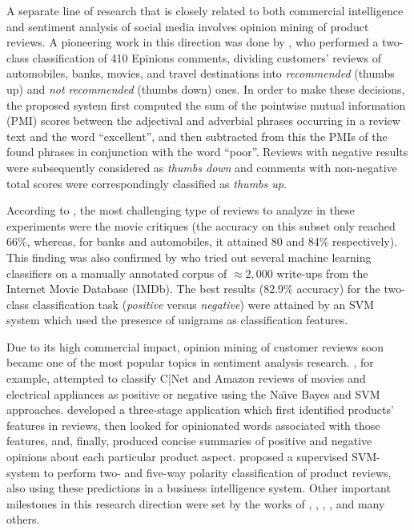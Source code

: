 A separate line of research that is closely related to both commercial
intelligence and sentiment analysis of social media involves opinion
mining of product reviews.  A pioneering work in this direction was
done by \citet{Turney:02}, who performed a two-class classification of
410 Epinions comments, dividing customers' reviews of automobiles,
banks, movies, and travel destinations into \emph{recommended} (thumbs
up) and \emph{not recommended} (thumbs down) ones.  In order to make
these decisions, the proposed system first computed the sum of the
pointwise mutual information (PMI) scores between the adjectival and
adverbial phrases occurring in a review text and the word
``excellent'', and then subtracted from this the PMIs of the found
phrases in conjunction with the word ``poor''.  Reviews with negative
results were subsequently considered as \emph{thumbs down} and
comments with non-negative total scores were correspondingly
classified as \emph{thumbs up}.

According to \citet{Turney:02}, the most challenging type of reviews
to analyze in these experiments were the movie critiques (the accuracy
on this subset only reached 66\%, whereas, for banks and automobiles,
it attained 80 and 84\% respectively).  This finding was also
confirmed by \citet{Pang:02} who tried out several machine learning
classifiers on a manually annotated corpus of $\approx2,000$ write-ups
from the Internet Movie Database (IMDb).  The best results (82.9\%
accuracy) for the two-class classification task (\emph{positive}
versus \emph{negative}) were attained by an SVM system which used the
presence of unigrams as classification features.

Due to its high commercial impact, opinion mining of customer reviews
soon became one of the most popular topics in sentiment analysis
research.  \citet{Dave:03}, for example, attempted to classify C|Net
and Amazon reviews of movies and electrical appliances as positive or
negative using the Na\"{\i}ve Bayes and SVM approaches.  \citet{Hu:04}
developed a three-stage application which first identified products'
features in reviews, then looked for opinionated words associated with
those features, and, finally, produced concise summaries of positive
and negative opinions about each particular product aspect.
\citet{Funk:08} proposed a supervised SVM-system to perform two- and
five-way polarity classification of product reviews, also using these
predictions in a business intelligence system.  Other important
milestones in this research direction were set by the works of
\citet{Popescu:05}, \citet{Ding:09}, \citet{Wei:10},
\citet{Mukherjee:12}, and many others.

